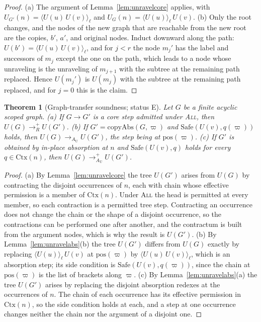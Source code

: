 \documentclass[11pt]{article}
\newtheorem{theorem}{Theorem}[section]
\theoremstyle{definition}
\theoremstyle{remark}
\newcommand{\br}[2]{\langle #1\rangle_{#2}}
\newcommand{\Ctx}{\mathrm{Ctx}}
\newcommand{\Et}{status E}
\begin{document}
\begin{proof}
(a) The argument of Lemma~\ref{lem:unravelcore} applies, with $U_{G'}(n)=\br{U(u)\,U(v)}\ell$ and $U_G(n)=\br{U(u)}\ell\,U(v)$. (b) Only the root changes, and the nodes of the new graph that are reachable from the new root are the copies, $b'$, $a'$, and original nodes. Induct downward along the path: $U(b')=\br{U(u)\,U(v)}\ell$, and for $j<r$ the node $m_j'$ has the label and successors of $m_j$ except the one on the path, which leads to a node whose unraveling is the unraveling of $m_{j+1}$ with the subtree at the remaining path replaced. Hence $U(m_j')$ is $U(m_j)$ with the subtree at the remaining path replaced, and for $j=0$ this is the claim.
\end{proof}

\begin{theorem}[Graph-transfer soundness; \Et]\label{thm:graphsound}
Let $G$ be a finite acyclic scoped graph. (a) If $G\to G'$ is a core step admitted under \textsc{All}, then $U(G)\to_R^{+}U(G')$. (b) If $G'=\mathrm{copyAbs}(G,\varpi)$ and $\mathrm{Safe}(U(v),q(\varpi))$ holds, then $U(G)\to_{A_{\mathrm U}}U(G')$, the step being at $\mathrm{pos}(\varpi)$. (c) If $G'$ is obtained by in-place absorption at $n$ and $\mathrm{Safe}(U(v),q)$ holds for every $q\in\Ctx(n)$, then $U(G)\to_{A_{\mathrm U}}^{+}U(G')$.
\end{theorem}

\begin{proof}
(a) By Lemma~\ref{lem:unravelcore} the tree $U(G')$ arises from $U(G)$ by contracting the disjoint occurrences of $n$, each with chain whose effective permission is a member of $\Ctx(n)$. Under \textsc{All} the head is permitted at every member, so each contraction is a permitted tree step. Contracting an occurrence does not change the chain or the shape of a disjoint occurrence, so the contractions can be performed one after another, and the contractum is built from the argument nodes, which is why the result is $U(G')$. (b) By Lemma~\ref{lem:unravelabs}(b) the tree $U(G')$ differs from $U(G)$ exactly by replacing $\br{U(u)}\ell\,U(v)$ at $\mathrm{pos}(\varpi)$ by $\br{U(u)\,U(v)}\ell$, which is an absorption step; its side condition is $\mathrm{Safe}(U(v),q(\varpi))$, since the chain at $\mathrm{pos}(\varpi)$ is the list of brackets along $\varpi$. (c) By Lemma~\ref{lem:unravelabs}(a) the tree $U(G')$ arises by replacing the disjoint absorption redexes at the occurrences of $n$. The chain of each occurrence has its effective permission in $\Ctx(n)$, so the side condition holds at each, and a step at one occurrence changes neither the chain nor the argument of a disjoint one.
\end{proof}
\end{document}
